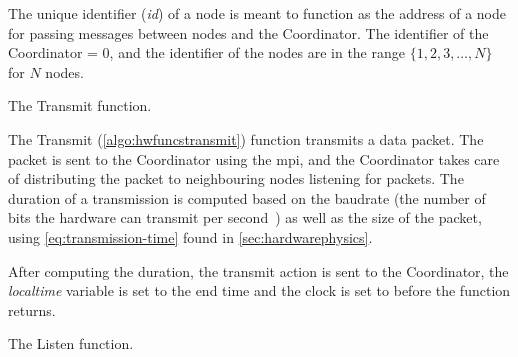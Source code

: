 The unique identifier (\textit{id}) of a node is meant to function as the address of a node for passing
messages between nodes and the Coordinator. The identifier of the Coordinator = $0$, and the identifier of the
nodes are in the range $\{ 1, 2, 3, \ldots, N \}$ for $N$ nodes.

\begin{algorithm}[ht]
    \DontPrintSemicolon
    

    \caption{The Transmit function.}
    \label{algo:hwfuncstransmit}
\end{algorithm}

The Transmit (\autoref{algo:hwfuncstransmit}) function transmits a data packet. The packet is sent
to the Coordinator using the \gls{mpi}, and the Coordinator takes care of distributing the packet to
neighbouring nodes listening for packets. The duration of a transmission is computed based on the
\gls{baudrate} (the number of bits the hardware can transmit per second~\cite{website:baudrate-mathworks}) as
well as the size of the packet, using \autoref{eq:transmission-time} found in \autoref{sec:hardwarephysics}.

After computing the duration, the transmit action is sent to the Coordinator, the \textit{localtime} variable
is set to the end time and the clock is set to \KwNow before the function returns. \medbreak

\begin{algorithm}[ht]
    \DontPrintSemicolon
    
    
    \caption{The Listen function.}
    \label{algo:hwfuncslisten}
\end{algorithm}

